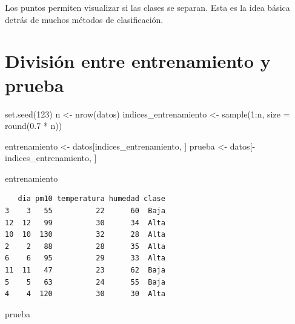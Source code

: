 \documentclass[
  spanish,
  11pt,
  letterpaper,
]{book}
\newenvironment{Shaded}{}{}
\newcommand{\AttributeTok}[1]{\textcolor[rgb]{0.84,0.23,0.29}{#1}}
\newcommand{\DecValTok}[1]{\textcolor[rgb]{0.00,0.36,0.77}{#1}}
\newcommand{\FloatTok}[1]{\textcolor[rgb]{0.00,0.36,0.77}{#1}}
\newcommand{\FunctionTok}[1]{\textcolor[rgb]{0.44,0.26,0.76}{#1}}
\newcommand{\NormalTok}[1]{\textcolor[rgb]{0.14,0.16,0.18}{#1}}
\newcommand{\OtherTok}[1]{\textcolor[rgb]{0.44,0.26,0.76}{#1}}
\newcommand{\SpecialCharTok}[1]{\textcolor[rgb]{0.00,0.36,0.77}{#1}}
\begin{document}
\begin{tcolorbox}[enhanced jigsaw, arc=.35mm, bottomrule=.15mm, bottomtitle=1mm, breakable, colback=white, colbacktitle=quarto-callout-tip-color!10!white, colframe=quarto-callout-tip-color-frame, coltitle=black, left=2mm, leftrule=.75mm, opacityback=0, opacitybacktitle=0.6, rightrule=.15mm, title=\textcolor{quarto-callout-tip-color}{\faLightbulb}\hspace{0.5em}{Interpretación del resultado}, titlerule=0mm, toprule=.15mm, toptitle=1mm]

Los puntos permiten visualizar si las clases se separan. Esta es la idea
básica detrás de muchos métodos de clasificación.

\end{tcolorbox}

\section{División entre entrenamiento y
prueba}\label{divisiuxf3n-entre-entrenamiento-y-prueba}

\begin{Shaded}
\begin{Highlighting}[]
\FunctionTok{set.seed}\NormalTok{(}\DecValTok{123}\NormalTok{)}
\NormalTok{n }\OtherTok{\textless{}{-}} \FunctionTok{nrow}\NormalTok{(datos)}
\NormalTok{indices\_entrenamiento }\OtherTok{\textless{}{-}} \FunctionTok{sample}\NormalTok{(}\DecValTok{1}\SpecialCharTok{:}\NormalTok{n, }\AttributeTok{size =} \FunctionTok{round}\NormalTok{(}\FloatTok{0.7} \SpecialCharTok{*}\NormalTok{ n))}

\NormalTok{entrenamiento }\OtherTok{\textless{}{-}}\NormalTok{ datos[indices\_entrenamiento, ]}
\NormalTok{prueba }\OtherTok{\textless{}{-}}\NormalTok{ datos[}\SpecialCharTok{{-}}\NormalTok{indices\_entrenamiento, ]}

\NormalTok{entrenamiento}
\end{Highlighting}
\end{Shaded}

\begin{verbatim}
   dia pm10 temperatura humedad clase
3    3   55          22      60  Baja
12  12   99          30      34  Alta
10  10  130          32      28  Alta
2    2   88          28      35  Alta
6    6   95          29      33  Alta
11  11   47          23      62  Baja
5    5   63          24      55  Baja
4    4  120          30      30  Alta
\end{verbatim}

\begin{Shaded}
\begin{Highlighting}[]
\NormalTok{prueba}
\end{Highlighting}
\end{Shaded}
\end{document}
